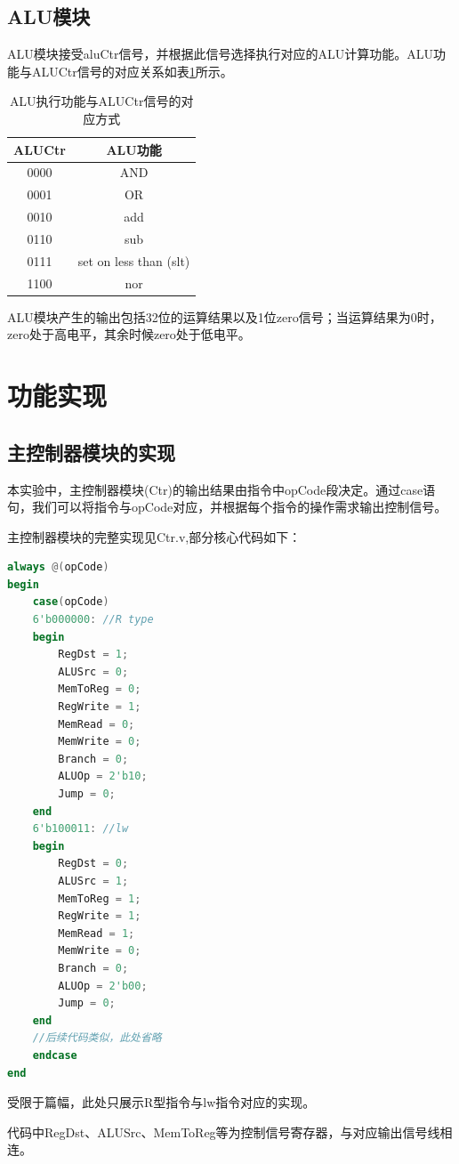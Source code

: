 \documentclass[UTF8]{ctexart}
\begin{document}
\subsection{ALU模块}
ALU模块接受aluCtr信号，并根据此信号选择执行对应的ALU计算功能。ALU功能与ALUCtr信号的对应关系如表\ref{tab-alu-ctr-sig-name}所示。
\begin{table}[H]
    \centering
    \begin{tabular}{|c|c|}
        \hline
        ALUCtr & ALU功能 \\
        \hline
        0000 & AND \\
        0001 & OR \\
        0010 & add \\
        0110 & sub \\
        0111 & set on less than (slt) \\
        1100 & nor \\
        \hline
    \end{tabular}
    \caption{ALU执行功能与ALUCtr信号的对应方式}
    \label{tab-alu-ctr-sig-name}
\end{table}\par
ALU模块产生的输出包括32位的运算结果以及1位zero信号；当运算结果为0时，zero处于高电平，其余时候zero处于低电平。
\section{功能实现}
\subsection{主控制器模块的实现}
本实验中，主控制器模块(Ctr)的输出结果由指令中opCode段决定。通过case语句，我们可以将指令与opCode对应，并根据每个指令的操作需求输出控制信号。\par
主控制器模块的完整实现见Ctr.v,部分核心代码如下：
\begin{lstlisting}[language=verilog]
always @(opCode)
begin
    case(opCode)
    6'b000000: //R type
    begin
        RegDst = 1;
        ALUSrc = 0;
        MemToReg = 0;
        RegWrite = 1;
        MemRead = 0;
        MemWrite = 0;
        Branch = 0;
        ALUOp = 2'b10;
        Jump = 0;
    end
    6'b100011: //lw
    begin
        RegDst = 0;
        ALUSrc = 1;
        MemToReg = 1;
        RegWrite = 1;
        MemRead = 1;
        MemWrite = 0;
        Branch = 0;
        ALUOp = 2'b00;
        Jump = 0;
    end
    //后续代码类似，此处省略
    endcase
end
\end{lstlisting}\par
受限于篇幅，此处只展示R型指令与lw指令对应的实现。\par
代码中RegDst、ALUSrc、MemToReg等为控制信号寄存器，与对应输出信号线相连。
\end{document}
